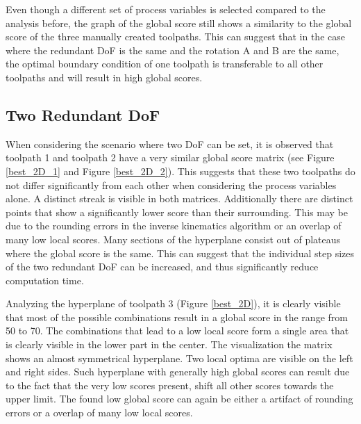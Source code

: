 Even though a different set of process variables is selected compared to the analysis before, the graph of the global score still shows a similarity to the global score of the three manually created toolpaths. This can suggest that in the case where the redundant \acrshort{DoF} is the same and the rotation A and B are the same, the optimal boundary condition of one toolpath is transferable to all other toolpaths and will result in high global scores. %


\subsection{Two Redundant DoF}
When considering the scenario where two \acrshort{DoF} can be set, it is observed that toolpath 1 and toolpath 2 have a very similar global score matrix (see Figure \ref{best_2D_1} and Figure \ref{best_2D_2}). This suggests that these two toolpaths do not differ significantly from each other when considering the process variables alone. A distinct streak is visible in both matrices. Additionally there are distinct points that show a significantly lower score than their surrounding. This may be due to the rounding errors in the inverse kinematics algorithm or an overlap of many low local scores. Many sections of the hyperplane consist out of plateaus where the global score is the same. This can suggest that the individual step sizes of the two redundant \acrshort{DoF} can be increased, and thus significantly reduce computation time. 

Analyzing the hyperplane of toolpath 3 (Figure \ref{best_2D}), it is clearly visible that most of the possible combinations result in a global score in the range from 50 to 70. The combinations that lead to a low local score form a single area that is clearly visible in the lower part in the center. The visualization the matrix shows an almost symmetrical hyperplane. Two local optima are visible on the left and right sides. Such hyperplane with generally high global scores can result due to the fact that the very low scores present, shift all other scores towards the upper limit. The found low global score can again be either a artifact of rounding errors or a overlap of many low local scores.

